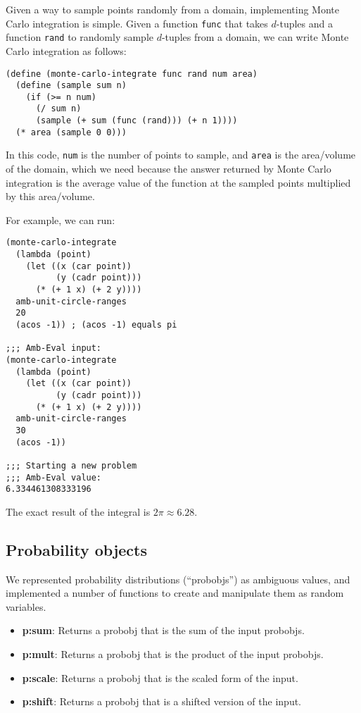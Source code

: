 \documentclass{article}
\begin{document}
Given a way to sample points randomly from a domain, implementing Monte Carlo
integration is simple. Given a function \texttt{func} that takes $d$-tuples and
a function \texttt{rand} to randomly sample $d$-tuples from a domain, we can
write Monte Carlo integration as follows:
\begin{lstlisting}
(define (monte-carlo-integrate func rand num area)
  (define (sample sum n)
    (if (>= n num)
      (/ sum n)
      (sample (+ sum (func (rand))) (+ n 1))))
  (* area (sample 0 0)))
\end{lstlisting}
In this code, \texttt{num} is the number of points to sample, and \texttt{area}
is the area/volume of the domain, which we need because the answer returned by
Monte Carlo integration is the average value of the function at the sampled
points multiplied by this area/volume.

For example, we can run:
\begin{lstlisting}
(monte-carlo-integrate
  (lambda (point)
    (let ((x (car point))
          (y (cadr point)))
      (* (+ 1 x) (+ 2 y))))
  amb-unit-circle-ranges
  20
  (acos -1)) ; (acos -1) equals pi

;;; Amb-Eval input:
(monte-carlo-integrate
  (lambda (point)
    (let ((x (car point))
          (y (cadr point)))
      (* (+ 1 x) (+ 2 y))))
  amb-unit-circle-ranges
  30
  (acos -1))

;;; Starting a new problem
;;; Amb-Eval value:
6.334461308333196
\end{lstlisting}
The exact result of the integral is $2\pi \approx 6.28$.

\subsection{Probability objects}

We represented probability distributions (``probobjs'') as ambiguous
values, and implemented a number of functions to create and manipulate
them as random variables.
\begin{itemize}
  \item \textbf{p:sum}: Returns a {probobj} that is the sum of the input
{probobj}s.
  \item \textbf{p:mult}: Returns a {probobj} that is the product of the
input {probobj}s.
  \item \textbf{p:scale}: Returns a {probobj} that is the scaled form of
the input.
  \item \textbf{p:shift}: Returns a {probobj} that is a shifted version
of the input.
\end{itemize}
\end{document}
